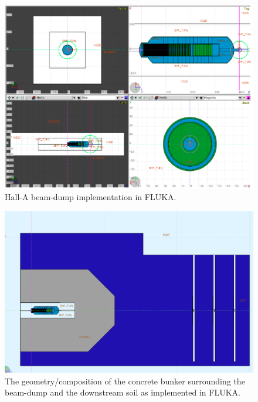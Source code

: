 \begin{figure}[h!] 
\center
\includegraphics[width=14.5cm]{figs/fluka-bd.pdf}
\caption{Hall-A beam-dump implementation in FLUKA. }
\label{fig:fluka-bd}
\end{figure}
\begin{figure}[h!] 
\center
\includegraphics[width=12.5cm]{figs/flukaSetup.pdf}
\caption{The geometry/composition  of the concrete bunker surrounding the beam-dump and  the downstream soil as implemented in FLUKA.}
\label{fig:fluka-bd-dwns}
\end{figure}
